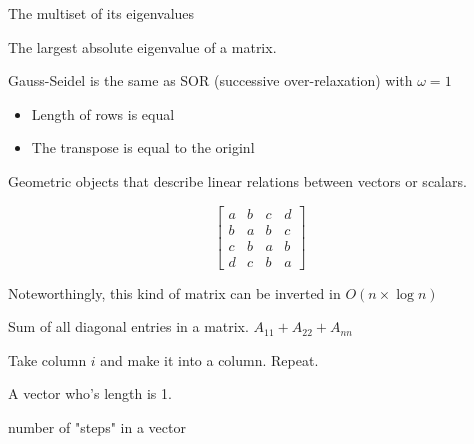 \begin{definition}
    The multiset of its eigenvalues
\end{definition}

\begin{definition}
    The largest absolute eigenvalue of a matrix.
\end{definition}

\begin{definition}
    Gauss-Seidel is the same as SOR (successive over-relaxation) with $\omega=1$
\end{definition}

\begin{definition}[Symmetric]
    \begin{itemize}
        \item Length of rows is equal
        \item The transpose is equal to the originl
    \end{itemize}
\end{definition}

\begin{definition}[Tensor]
    Geometric objects that describe linear relations between vectors or scalars.
\end{definition}

\begin{definition}
    $$
    \begin{bmatrix}
    a & b & c & d \\
    b & a & b & c \\
    c & b & a & b \\
    d & c & b & a
    \end{bmatrix}
    $$

    Noteworthingly, this kind of matrix can be inverted in $O(n \times \log{n})$
\end{definition}

\begin{definition}[Trace]
    Sum of all diagonal entries in a matrix.
    $A_{11} + A_{22} + A_{nn}$
\end{definition}

\begin{definition}[Transpose]
    Take column $i$ and make it into a column. Repeat.
\end{definition}

\begin{definition}
    A vector who's length is 1.
\end{definition}


\begin{definition}
    number of "steps" in a vector
\end{definition}

